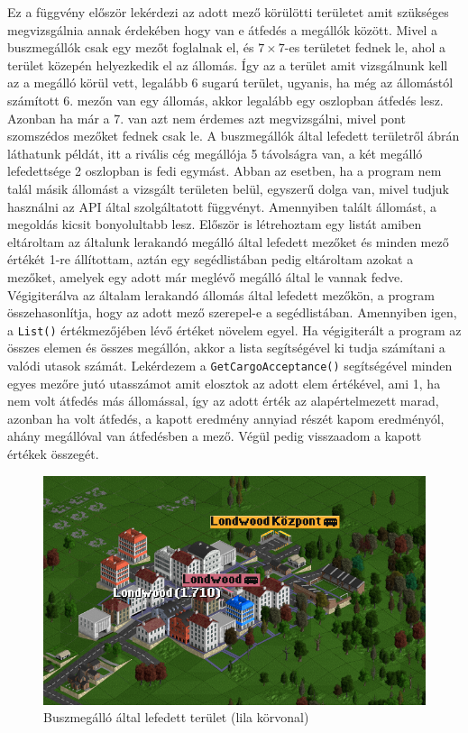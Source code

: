 Ez a függvény először lekérdezi az adott mező körülötti területet amit szükséges megvizsgálnia annak érdekében hogy van e átfedés a megállók között. Mivel a buszmegállók csak egy mezőt foglalnak el, és $7 \times 7$-es területet fednek le, ahol a terület közepén helyezkedik el az állomás. Így az a terület amit vizsgálnunk kell az a megálló körül vett, legalább 6 sugarú terület, ugyanis, ha még az állomástól számított 6. mezőn van egy állomás, akkor legalább egy oszlopban átfedés lesz. Azonban ha már a 7. van azt nem érdemes azt megvizsgálni, mivel pont szomszédos mezőket fednek csak le. A buszmegállók által lefedett területről  ábrán láthatunk példát, itt a rivális cég megállója 5 távolságra van, a két megálló lefedettsége 2 oszlopban is fedi egymást. Abban az esetben, ha a program nem talál másik állomást a vizsgált területen belül, egyszerű dolga van, mivel tudjuk használni az API által szolgáltatott függvényt. Amennyiben talált állomást, a megoldás kicsit bonyolultabb lesz. Először is létrehoztam egy listát amiben eltároltam az általunk lerakandó megálló által lefedett mezőket és minden mező értékét 1-re állítottam, aztán egy segédlistában pedig eltároltam azokat a mezőket, amelyek egy adott már meglévő megálló által le vannak fedve. Végigiterálva az általam lerakandó állomás által lefedett mezőkön, a program összehasonlítja, hogy az adott mező szerepel-e a segédlistában. Amennyiben igen, a \texttt{List()} értékmezőjében lévő értéket növelem egyel. Ha végigiterált a program az összes elemen és összes megállón, akkor a lista segítségével ki tudja számítani a valódi utasok számát. Lekérdezem a \texttt{GetCargoAcceptance()} segítségével minden egyes mezőre jutó utasszámot amit elosztok az adott elem értékével, ami 1, ha nem volt átfedés más állomással, így az adott érték az alapértelmezett marad, azonban ha volt átfedés, a kapott eredmény annyiad részét kapom eredményól, ahány megállóval van átfedésben a mező. Végül pedig visszaadom a kapott értékek összegét.

\begin{figure} [b!]
	\centering
	\includegraphics[width=\textwidth]{images/megallo.png}
	\caption{Buszmegálló által lefedett terület (lila körvonal)}
	\label{fig:megallo}
\end{figure}

